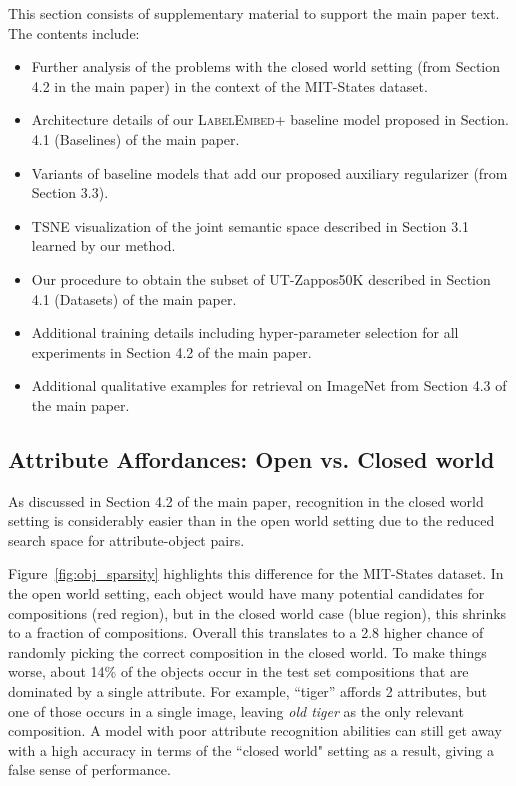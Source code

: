 \documentclass[runningheads]{llncs}
\newcommand{\SC}[1]{{\textsc{#1}}}
\newcommand{\reffig}[1]{Figure~\ref{#1}}
\begin{document}
This section consists of supplementary material to support the main paper text. The contents include:
\begin{itemize}
	\item Further analysis of the problems with the closed world setting (from Section 4.2 in the main paper) in the context of the MIT-States dataset.
	\item Architecture details of our \SC{LabelEmbed+} baseline model proposed in Section. 4.1 (Baselines) of the main paper.
	\item Variants of baseline models that add our proposed auxiliary regularizer (from Section 3.3).
      \item TSNE visualization of the joint semantic space described in Section 3.1 learned by our method.
	\item Our procedure to obtain the subset of UT-Zappos50K described in Section 4.1 (Datasets) of the main paper.
	\item Additional training details including hyper-parameter selection for all experiments in Section 4.2 of the main paper.

	\item Additional qualitative examples for retrieval on ImageNet from Section 4.3 of the main paper.
	
\end{itemize}

\subsection*{Attribute Affordances: Open vs. Closed world}
As discussed in Section 4.2 of the main paper, recognition in the closed world setting is considerably easier than in the open world setting due to the reduced search space for attribute-object pairs. 

\reffig{fig:obj_sparsity} highlights this difference for the MIT-States dataset. In the open world setting, each object would have many potential candidates for compositions (red region), but in the closed world case (blue region), this shrinks to a fraction of compositions. Overall this translates to a 2.8 higher chance of randomly picking the correct composition in the closed world.  
To make things worse, about 14\% of the objects occur in the test set compositions that are dominated by a single attribute. For example, ``tiger'' affords 2 attributes, but one of those occurs in a single image, leaving \emph{old tiger} as the only relevant composition. A model with poor attribute recognition abilities can still get away with a high accuracy  in terms of the ``closed world" setting as a result, giving a false sense of performance.
\end{document}
